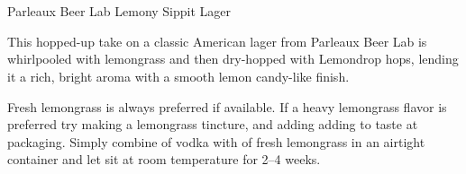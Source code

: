 \part{\styleamericanlager}

\begin{recipie}{Parleaux Beer Lab Lemony Sippit Lager}

\begin{aboutblock}
This hopped-up take on a classic American lager from Parleaux Beer Lab is whirlpooled
with lemongrass and then dry-hopped with Lemondrop hops, lending it a rich, bright aroma
with a smooth lemon candy-like finish.
\end{aboutblock}


\begin{methodandtiming}
  
\begin{mashsteps}
\end{mashsteps}

\begin{fermentationsteps}
\end{fermentationsteps}

\begin{directions}
Fresh lemongrass is always preferred if available. If a heavy lemongrass flavor is preferred
try making a lemongrass tincture, and adding adding to taste at packaging. Simply combine
 of vodka with  of fresh lemongrass in an airtight container and let sit at
room temperature for 2--4 weeks.
\end{directions}

\end{methodandtiming}

\pagebreak

\begin{ingredientsblock}

\begin{malts}
\end{malts}

\begin{hops}
\end{hops}

\begin{yeasts}
\end{yeasts}

\end{ingredientsblock}

\end{recipie}

